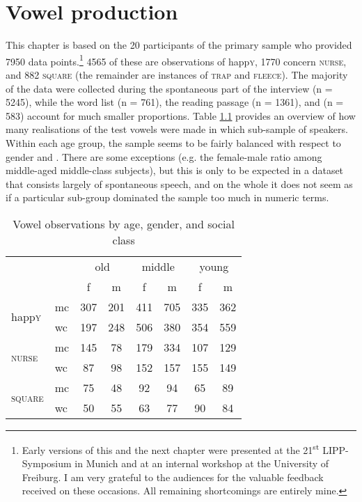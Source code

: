 \chapter{Vowel production}
\label{ch.prod_results_vow}

This chapter is based on the 20 participants of the primary sample who provided 7950 data points.\footnote{Early versions of this and the next chapter were presented at the 21\textsuperscript{st} LIPP-Symposium in Munich and at an internal workshop at the University of Freiburg. I am very grateful to the audiences for the valuable feedback received on these occasions. All remaining shortcomings are entirely mine.}
4565 of these are observations of happ\textsc{y}, 1770 concern \textsc{nurse}, and 882 \textsc{square} (the remainder are instances of \textsc{trap} and \textsc{fleece}).
The majority of the data were collected during the spontaneous part of the interview (n = 5245), while the word list (n = 761), the reading passage (n = 1361), and  (n = 583) account for much smaller proportions.
Table \ref{tab.vowels.n.observations} provides an overview of how many realisations of the test vowels were made in which sub-sample of speakers.
Within each age group, the sample seems to be fairly balanced with respect to gender and .
There are some exceptions (e.g. the female-male ratio among middle-aged middle-class subjects), but this is only to be expected in a dataset that consists largely of spontaneous speech, and on the whole it does not seem as if a particular sub-group dominated the sample too much in numeric terms.

\begin{table}[h!]
	\centering
	\caption{Vowel observations by age, gender, and social class}
	\label{tab.vowels.n.observations}
	\begin{tabular}{llcccccc}
		\hline
		\multicolumn{2}{c}{} & \multicolumn{2}{c}{old} & \multicolumn{2}{c}{middle} & \multicolumn{2}{c}{young}\\
		& & f & m & f & m & f & m\\
		\hline
		\multirow{2}{*}{happ\textsc{y}} & mc & 307 & 201 & 411 & 705 & 335 & 362\\
		& wc & 197 & 248 & 506 & 380 & 354 & 559\\
		\multirow{2}{*}{\textsc{nurse}} & mc & 145 & 78 & 179 & 334 & 107 & 129\\
		& wc & 87 & 98 & 152 & 157 & 155 & 149\\
		\multirow{2}{*}{\textsc{square}} & mc & 75 & 48 & 92 & 94 & 65 & 89\\
		& wc & 50 & 55 & 63 & 77 & 90 & 84\\
		\hline
	\end{tabular}
\end{table}

